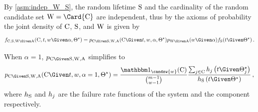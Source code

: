 \documentclass[../main.tex]{subfiles}
\begin{document}
By \cref{asm:indep_W_S}, the random lifetime $\mathrm{S}$ and the cardinality of the random candidate set $\RV{W} = \Card{\rvcand}$ are independent, thus by the axioms of probability the joint density of $\mathrm{C}$, $\mathrm{S}$, and $\mathrm{W}$ is given by
\begin{equation}
\pdf_{\rvcand, \sv, \RV{W} \Given \RV{A}}(\cand, t, w \Given \alpha, \tparam\sysparam) = \pmf_{\rvcand \Given \sv, \RV{W}, \RV{A}}(\cand \Given t, w, \alpha, \tparam\sysparam) \pmf_{\RV{W} \Given \RV{A}}(w \Given \alpha) \spdf(t \Given \tparam\sysparam)\,.
\end{equation}

\begin{corollary}
\label{def:general_cond_cand_probability}
When $\alpha=1$, $\pmf_{\rvcand \Given \sv, \RV{W}, \RV{A}}$ simplifies to 
\begin{equation}
\label{eq:general_cond_cand_probability}
\pmf_{\rvcand \Given \sv, \RV{W}, \RV{A}}(\cand \Given t, w, \alpha=1, \tparam\sysparam) =
\frac{\SetIndicator{\candsw{w}}(\cand)}{\binom{m-1}{w-1}}
\frac
{
	\sum_{j \in \cand} \haz_j\left(t \Given \tparam\sysparam_j\right)
}
{
	\haz_{\sv}\left(t \Given \tparam\sysparam\right)
}\,,
\end{equation}
where $h_{\mathrm{S}}$ and $h_j$ are the failure rate functions of the system 
and the \jth component respectively.
\end{corollary}
\end{document}
